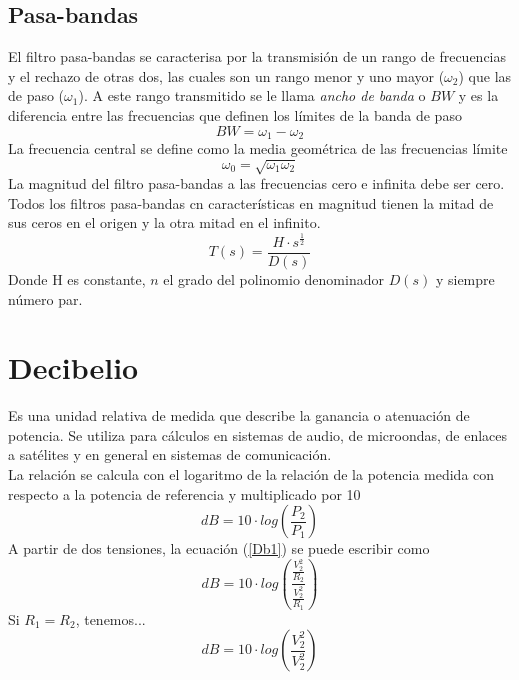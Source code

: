 \documentclass[12pt,spanish,lettersize]{article}
\begin{document}
\subsection{Pasa-bandas}
El filtro pasa-bandas se caracterisa por la transmisi\'on de un rango de frecuencias y el rechazo de otras dos, las cuales son un rango menor y uno mayor ($\omega_{2}$) que las de paso ($\omega_{1}$). A este rango transmitido se le llama \emph{ancho de banda} o $BW$ y es la diferencia entre las frecuencias que definen los l\'imites de la banda de paso
\begin{equation}
BW= \omega_{1}- \omega_{2}
\end{equation}
La frecuencia central se define como la media geom\'etrica de las frecuencias l\'imite
\begin{equation}
\omega_{0} = \sqrt{\omega_{1}\omega_{2}}
\end{equation}
La magnitud del filtro pasa-bandas a las frecuencias cero e infinita debe ser cero. Todos los filtros pasa-bandas cn caracter\'isticas en magnitud tienen la mitad de sus ceros en el origen y la otra mitad en el infinito.
\begin{equation}
T(s)=\frac{H\cdot s^{\frac{1}{2}}}{D(s)}
\end{equation}
Donde H es constante, $n$ el grado del polinomio denominador $D(s)$ y siempre n\'umero par.
\section{Decibelio}
Es una unidad relativa de medida que describe la ganancia o atenuaci\'on de potencia. Se utiliza para c\'alculos en sistemas de audio, de microondas, de enlaces a sat\'elites y en general en sistemas de comunicaci\'on.\\
La relaci\'on se calcula con el logaritmo de la relaci\'on de la potencia medida con respecto a la potencia de referencia y multiplicado por 10
\begin{equation}\label{Db1}
dB = 10\cdot log(\frac{P_{2}}{P_{1}})
\end{equation}
A partir de dos tensiones, la ecuaci\'on (\ref{Db1}) se puede escribir como
\begin{equation}
dB=10\cdot log(\frac{\frac{V_{2}^{2}}{R_{2}}}{\frac{V_{2}^{2}}{R_{1}}})
\end{equation}
Si $R_{1}=R_{2}$, tenemos...
\begin{equation}
dB=10\cdot log(\frac{V_{2}^{2}}{V_{2}^{2}})
\end{equation}
\end{document}
